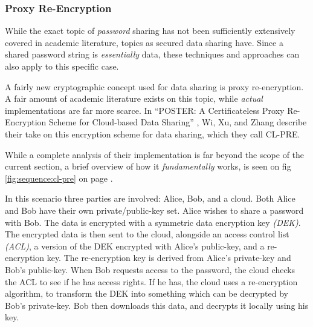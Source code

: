 			\subsubsection{Proxy Re-Encryption}
				While the exact topic of \emph{password} sharing has not been sufficiently extensively covered in academic literature, topics as secured data sharing have. Since a shared password string is \emph{essentially} data, these techniques and approaches can also apply to this specific case. 

				A fairly new cryptographic concept used for data sharing is proxy re-encryption. A fair amount of academic literature exists on this topic, while \emph{actual} implementations are far more scarce. In ``POSTER: A Certificateless Proxy Re-Encryption Scheme for Cloud-based Data Sharing'' \cite{Wu:2011:PCP:2046707.2093514}, Wi, Xu, and Zhang describe their take on this encryption scheme for data sharing, which they call CL-PRE.

				While a complete analysis of their implementation is far beyond the scope of the current section, a brief overview of how it \emph{fundamentally} works, is seen on fig \ref{fig:sequence:cl-pre} on page \pageref{fig:sequence:cl-pre}.

				In this scenario three parties are involved: Alice, Bob, and a cloud. Both Alice and Bob have their own private/public-key set. Alice wishes to share a password with Bob. The data is encrypted with a symmetric data encryption key \emph{(DEK)}. The encrypted data is then sent to the cloud, alongside an access control list \emph{(ACL)}, a version of the DEK encrypted with Alice's public-key, and a re-encryption key. The re-encryption key is derived from Alice's private-key and Bob's public-key. When Bob requests access to the password, the cloud checks the ACL to see if he has access rights. If he has, the cloud uses a re-encryption algorithm, to transform the DEK into something which can be decrypted by Bob's private-key. Bob then downloads this data, and decrypts it locally using his key.


